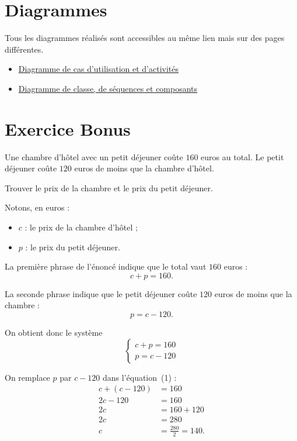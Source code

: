 \documentclass[a4paper,12pt]{article}
\begin{document}
	\section{Diagrammes}
	Tous les diagrammes réalisés sont accessibles au même lien mais sur des pages différentes. 
	\begin{itemize}
		\item \href{https://lucid.app/lucidchart/24c1c51b-c5d9-4874-8372-94b7308577d1/edit?viewport_loc=-1163\%2C-384\%2C3006\%2C1270\%2CS0-PFrnG1pE9&invitationId=inv_87c0ee0d-7f44-47a7-8205-060f06157fbc}{Diagramme de cas d'utilisation et d'activités}
		
		\item 
		\href{https://lucid.app/lucidchart/741f6a2b-3b74-4b4e-b0e5-5848bc77c504/edit?viewport_loc=-679%2C-42%2C2156%2C883%2Cclasses&invitationId=inv_79bca8a8-1596-40c4-864a-2f5000a2be80}{Diagramme de classe, de séquences et composants}
	\end{itemize}
	
	\section{Exercice Bonus}
	Une chambre d'hôtel avec un petit déjeuner coûte $160$ euros au total.
	Le petit déjeuner coûte $120$ euros de moins que la chambre d'hôtel.
	
	Trouver le prix de la chambre et le prix du petit déjeuner.
	
	Notons, en euros :
	\begin{itemize}
		\item $c$ : le prix de la chambre d'hôtel ;
		\item $p$ : le prix du petit déjeuner.
	\end{itemize}
	
	La première phrase de l'énoncé indique que le total vaut $160$ euros :
	\[
	c + p = 160. \tag{1}
	\]
	
	La seconde phrase indique que le petit déjeuner coûte $120$ euros de moins que la chambre :
	\[
	p = c - 120. \tag{2}
	\]
	
	On obtient donc le système
	\[
	\begin{cases}
		c + p = 160 \\
		p = c - 120
	\end{cases}
	\]
	
	On remplace $p$ par $c - 120$ dans l'équation~(1) :
	\begin{align*}
		c + (c - 120) &= 160 \\
		2c - 120      &= 160 \\
		2c            &= 160 + 120 \\
		2c            &= 280 \\
		c             &= \frac{280}{2} = 140.
	\end{align*}
	
\end{document}

